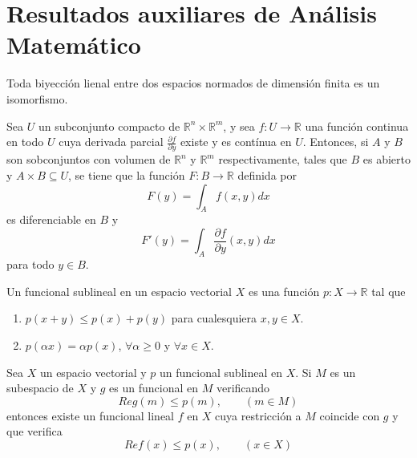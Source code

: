 \section{Resultados auxiliares de Análisis Matemático}

\begin{teorema}\label{thm:h01}
Toda biyección lienal entre dos espacios normados de dimensión finita es un isomorfismo. 
\end{teorema}

\begin{teorema}\label{thm:h02}
Sea $U$ un subconjunto compacto de $\mathds{R}^{n}\times\mathds{R}^{m}$, y sea $f: U \rightarrow \mathds{R}$ una función continua en todo $U$ cuya derivada parcial $\frac{\partial f}{\partial y}$ existe y es contínua en $U$. Entonces, si $A$ y $B$ son sobconjuntos con volumen de $\mathds{R}^{n}$ y $\mathds{R}^{m}$ respectivamente, tales que $B$ es abierto y $A\times B \subseteq U$, se tiene que la función $F:B\rightarrow \mathds{R}$ definida por 
\begin{equation}
F(y) = \int_{A} f(x,y) dx
\end{equation}
es diferenciable en $B$ y 
\begin{equation}
F'(y) = \int_{A}\frac{\partial f}{\partial y} (x,y) dx
\end{equation}
para todo $y\in B$.
\end{teorema}

\begin{definicion}
Un funcional sublineal en un espacio vectorial $X$ es una función $p:X\rightarrow \mathds{R}$ tal que
\begin{enumerate}
\item $p(x+y)\leq p(x) + p(y)$ para cualesquiera $x,y\in X$.
\item $p(\alpha x) = \alpha p(x)$, $\forall\alpha \geq 0$ y  $\forall x\in X$.
\end{enumerate}
\end{definicion}

\begin{teorema}\label{thm:h03}
Sea $X$ un espacio vectorial y $p$ un funcional sublineal en $X$. Si $M$ es un subespacio de $X$ y $g$ es un funcional en $M$ verificando 
$$ Re g(m) \leq p(m), \qquad (m\in M)$$
entonces existe un funcional lineal $f$ en $X$ cuya restricción a $M$ coincide con $g$ y que verifica
$$Re f(x) \leq p(x), \qquad (x\in X)$$
\end{teorema}


